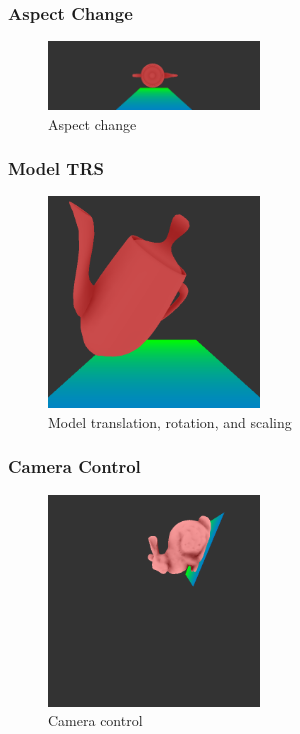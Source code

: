 \documentclass{beamer}
\begin{document}
\begin{frame}
  \frametitle{Aspect Change}
  \begin{figure}
    \includegraphics[width=0.5\textwidth]{aspect_change}
    \caption{Aspect change}
  \end{figure}
\end{frame}

\begin{frame}
  \frametitle{Model TRS}
  \begin{figure}
    \includegraphics[width=0.5\textwidth]{model_trs}
    \caption{Model translation, rotation, and scaling}
  \end{figure}
\end{frame}

\begin{frame}
  \frametitle{Camera Control}
  \begin{figure}
    \includegraphics[width=0.5\textwidth]{camera_control}
    \caption{Camera control}
  \end{figure}
\end{frame}
\end{document}
